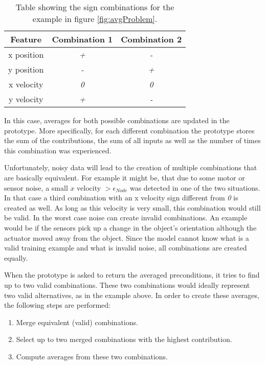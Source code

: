 \begin{table}
	\centering
	\begin{tabular}{|c|c|c|}
		\hline Feature & Combination 1 & Combination 2 \\ 
		\hline x position & \textit{+} & \textit{-} \\ 
		\hline y position & \textit{-} & \textit{+} \\ 
		\hline x velocity & \textit{0} & \textit{0} \\
		\hline y velocity & \textit{+} & \textit{-} \\ 
		\hline 
	\end{tabular} 
	\caption{Table showing the sign combinations for the example in figure \ref{fig:avgProblem}.}
	\label{tab:signCombinations}
\end{table}

In this case, averages for both possible combinations are updated in the prototype. More specifically, for each different combination the prototype stores the sum of the contributions, the sum of all inputs as well as the number of times this combination was experienced. 

Unfortunately, noisy data will lead to the creation of multiple combinations that are basically equivalent. For example it might be, that due to some motor or sensor noise, a small $x$ velocity $>\epsilon_{Node}$ was detected in one of the two situations. In that case a third combination with an x velocity sign different from \textit{0} is created as well. As long as this velocity is very small, this combination would still be valid. In the worst case noise can create invalid combinations. An example would be if the sensors pick up a change in the object's orientation although the actuator moved away from the object. Since the model cannot know what is a valid training example and what is invalid noise, all combinations are created equally.

When the prototype is asked to return the averaged preconditions, it tries to find up to two valid combinations. These two combinations would ideally represent two valid alternatives, as in the example above. 
In order to create these averages, the following steps are performed:
\begin{enumerate}
\item Merge equivalent (valid) combinations.
\item Select up to two merged combinations with the highest contribution.
\item Compute averages from these two combinations.
\end{enumerate}

